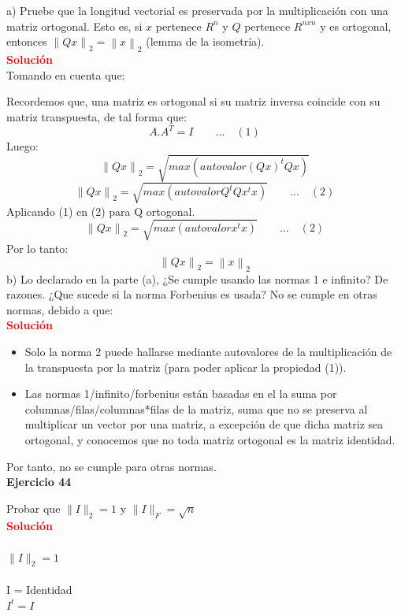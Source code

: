 \documentclass[12pt]{article}
\begin{document}
a) Pruebe que la longitud vectorial es preservada por la multiplicación con una matriz ortogonal. Esto es, si $x$ pertenece $R^n$ y $Q$ pertenece $R^{nxn}$ y es ortogonal, entonces $\left \| Qx \right \|_2 = \left \| x  \right \|_2$ (lemma de la isometría). \\

\noindent \textcolor{red}{\bf Solución}\\

Tomando en cuenta que:

Recordemos que, una matriz es ortogonal si su matriz inversa coincide con su matriz transpuesta, de tal forma que:
\[
    	A.A^T=I    \qquad ... \quad (1)
\]
Luego:
\[
    	\left \| Qx \right \|_2 = \sqrt{max(autovalor (Qx)^tQx)}
\]
\[
    	\left \| Qx \right \|_2 = \sqrt{max(autovalor Q^tQx^tx)}    \qquad ... \quad (2)
\]
Aplicando (1) en (2) para Q ortogonal.
\[
    	\left \| Qx \right \|_2 = \sqrt{max(autovalor x^tx)}    \qquad ... \quad (2)
\]
Por lo tanto:
\[
    	\left \| Qx \right \|_2 = \left \| x \right \|_2
\]
b) Lo declarado en la parte (a), ¿Se cumple usando las normas 1 e infinito? De razones. ¿Que sucede si la norma Forbenius es usada?
No se cumple en otras normas, debido a que:\\
\noindent \textcolor{red}{\bf Solución}\\
\begin{itemize}
    \item Solo la norma 2 puede hallarse mediante autovalores de la multiplicación de la transpuesta por la matriz (para poder aplicar la propiedad (1)).
    \item Las normas 1/infinito/forbenius están basadas en el la suma por columnas/filas/columnas*filas de la matriz, suma que no se preserva al multiplicar un vector por una matriz, a excepción de que dicha matriz sea ortogonal, y conocemos que no toda matriz ortogonal es la matriz identidad.
\end{itemize}
Por tanto, no se cumple para otras normas.\\


\noindent \textbf{Ejercicio 44}

Probar que $\|I\|_{2} = 1$ y $\|I\|_{F} = \sqrt{n}$\\

\noindent \textcolor{red}{\bf Solución}\\
\\
$\|I\|_{2} = 1$\\
\\
I = Identidad\\
$I^{t} = I$\\
\end{document}

